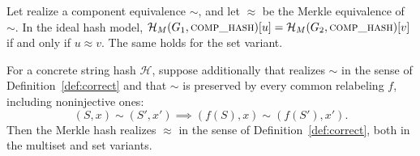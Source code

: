 \documentclass[twoside,leqno]{article}
\newcommand{\HM}{\mathcal{H}_{M}}
\begin{document}
\begin{theorem}
\label{thm:merkle}
Let  realize a component equivalence $\sim$, and let $\approx$ be the Merkle equivalence of $\sim$. In the ideal hash model, $\HM(G_1,\textproc{comp\_hash})[u]=\HM(G_2,\textproc{comp\_hash})[v]$ if and only if $u\approx v$. The same holds for the set variant.

For a concrete string hash $\mathcal{H}$, suppose additionally that  realizes $\sim$ in the sense of Definition~\ref{def:correct} and that $\sim$ is preserved by every common relabeling $f$, including noninjective ones:
\[
(S,x)\sim(S',x') \implies (f(S),x)\sim(f(S'),x').
\]
Then the Merkle hash realizes $\approx$ in the sense of Definition~\ref{def:correct}, both in the multiset and set variants.
\end{theorem}
\end{document}

